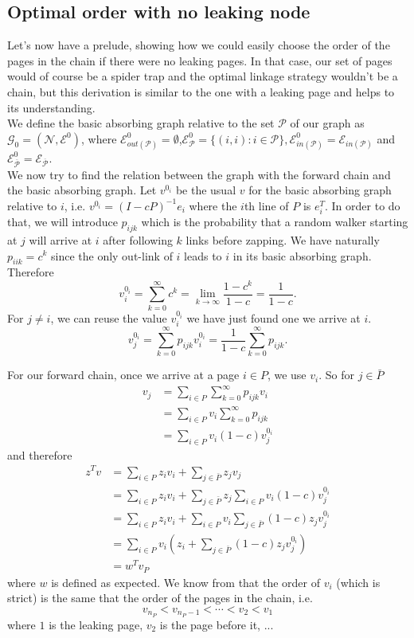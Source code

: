 \documentclass{article}
\newcommand{\1}{\mathbf{1}}
\theoremstyle{definition}
\begin{document}
\subsection{Optimal order with no leaking node}
\label{sec:no_leak}
Let's now have a prelude, showing how we could easily choose the order of the pages in the chain if there were
no leaking pages.
In that case, our set of pages would of course be a spider trap and the optimal linkage strategy wouldn't be a chain, but this derivation is similar
to the one with a leaking page and helps to its understanding.\\
We define the basic absorbing graph relative to the set $\mathcal{P}$ of our graph as $\mathcal{G}_0=(\mathcal{N},\mathcal{E}^0)$, where $\mathcal{E}_{out(\mathcal{P})}^0 = \emptyset$,$\mathcal{E}^0_{\mathcal{P}}=\{(i,i):i\in \mathcal{P}\},\mathcal{E}_{in(\mathcal{P})}^0 = \mathcal{E}_{in(\mathcal{P})}$ and $ \mathcal{E}^0_{\overline{\mathcal{P}}}=\mathcal{E}_{\overline{\mathcal{P}}}$.\\
We now try to find the relation between the graph with the forward chain and the basic absorbing graph.
Let $v^{0_i}$ be the usual $v$ for the basic absorbing graph relative to $i$,
i.e. $v^{0_i} = (I - cP)^{-1}e_i$ where the $i$th line of $P$ is $e_i^T$.
In order to do that, we will introduce $p_{ijk}$ which is the probability that a random walker starting at $j$
will arrive at $i$ after following $k$ links before zapping.
We have naturally $p_{iik} = c^k$ since the only out-link of $i$ leads to $i$ in its basic absorbing graph.
Therefore
\[ v_i^{0_i} = \sum_{k=0}^\infty c^k = \lim_{k \to \infty} \frac{1-c^k}{1-c} = \frac{1}{1-c}. \]
For $j \neq i$, we can reuse the value $v_i^{0_i}$ we have just found one we arrive at $i$.
\[ v_j^{0_i} = \sum_{k=0}^\infty p_{ijk} v_i^{0_i} = \frac{1}{1-c} \sum_{k=0}^\infty p_{ijk}. \]

For our forward chain,
once we arrive at a page $i \in P$, we use $v_i$.
So for $j \in \bar{P}$
\begin{align*}
  v_j & = \sum_{i \in P} \sum_{k = 0}^\infty p_{ijk} v_i\\
      & = \sum_{i \in P} v_i \sum_{k = 0}^\infty p_{ijk}\\
      & = \sum_{i \in P} v_i (1-c) v_j^{0_i}
\end{align*}
and therefore
\begin{align*}
  z^T v
  & = \sum_{i \in P} z_i v_i + \sum_{j \in \bar{P}} z_j v_j\\
  & = \sum_{i \in P} z_i v_i + \sum_{j \in \bar{P}} z_j\sum_{i \in P} v_i (1-c) v_j^{0_i}\\
  & = \sum_{i \in P} z_i v_i + \sum_{i \in P} v_i \sum_{j \in \bar{P}} (1-c) z_j v_j^{0_i}\\
  & = \sum_{i \in P} v_i \left(z_i + \sum_{j \in \bar{P}} (1-c) z_jv_j^{0_i}\right)\\
  & = w^T v_P
\end{align*}
where $w$ is defined as expected.
We know from \cite{de2008maximizing} that the order of $v_i$ (which is strict) is the same that
the order of the pages in the chain, i.e.
\[ v_{n_P} < v_{n_P-1} < \cdots < v_2 < v_1 \]
where $1$ is the leaking page, $v_2$ is the page before it, ...
\end{document}
